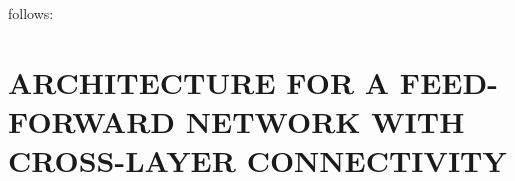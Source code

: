 \documentclass{jcmlatex}
\begin{document}
follows:%
\section{ARCHITECTURE FOR A FEED-FORWARD NETWORK
WITH CROSS-LAYER CONNECTIVITY}\label{sec:architecture}
\end{document}
